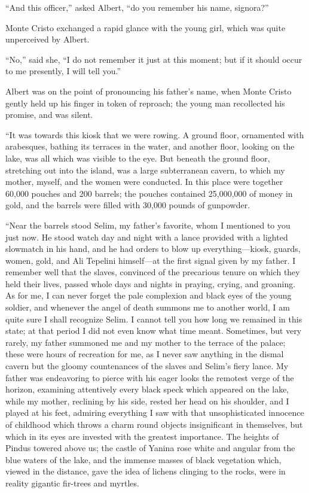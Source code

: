 “And this officer,” asked Albert, “do you remember his name, signora?”

Monte Cristo exchanged a rapid glance with the young girl, which was
quite unperceived by Albert.

“No,” said she, “I do not remember it just at this moment; but if it
should occur to me presently, I will tell you.”

Albert was on the point of pronouncing his father’s name, when Monte
Cristo gently held up his finger in token of reproach; the young man
recollected his promise, and was silent.

“It was towards this kiosk that we were rowing. A ground floor,
ornamented with arabesques, bathing its terraces in the water, and
another floor, looking on the lake, was all which was visible to the
eye. But beneath the ground floor, stretching out into the island, was
a large subterranean cavern, to which my mother, myself, and the women
were conducted. In this place were together 60,000 pouches and 200
barrels; the pouches contained 25,000,000 of money in gold, and the
barrels were filled with 30,000 pounds of gunpowder.

“Near the barrels stood Selim, my father’s favorite, whom I mentioned
to you just now. He stood watch day and night with a lance provided
with a lighted slowmatch in his hand, and he had orders to blow up
everything—kiosk, guards, women, gold, and Ali Tepelini himself—at the
first signal given by my father. I remember well that the slaves,
convinced of the precarious tenure on which they held their lives,
passed whole days and nights in praying, crying, and groaning. As for
me, I can never forget the pale complexion and black eyes of the young
soldier, and whenever the angel of death summons me to another world, I
am quite sure I shall recognize Selim. I cannot tell you how long we
remained in this state; at that period I did not even know what time
meant. Sometimes, but very rarely, my father summoned me and my mother
to the terrace of the palace; these were hours of recreation for me, as
I never saw anything in the dismal cavern but the gloomy countenances
of the slaves and Selim’s fiery lance. My father was endeavoring to
pierce with his eager looks the remotest verge of the horizon,
examining attentively every black speck which appeared on the lake,
while my mother, reclining by his side, rested her head on his
shoulder, and I played at his feet, admiring everything I saw with that
unsophisticated innocence of childhood which throws a charm round
objects insignificant in themselves, but which in its eyes are invested
with the greatest importance. The heights of Pindus towered above us;
the castle of Yanina rose white and angular from the blue waters of the
lake, and the immense masses of black vegetation which, viewed in the
distance, gave the idea of lichens clinging to the rocks, were in
reality gigantic fir-trees and myrtles.

